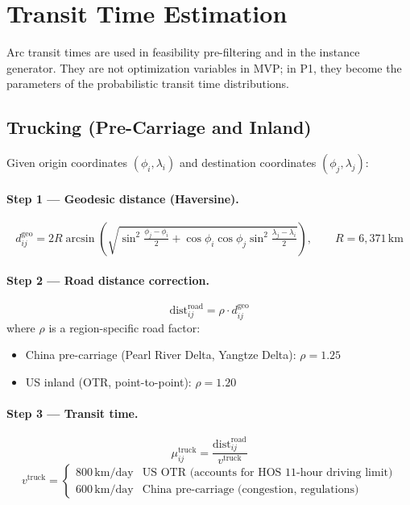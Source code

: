 \documentclass[11pt,a4paper]{article}
\theoremstyle{definition}
\begin{document}
\section{Transit Time Estimation}
\label{sec:transit}

Arc transit times are used in feasibility pre-filtering and in the instance generator.
They are not optimization variables in MVP; in P1, they become the parameters of
the probabilistic transit time distributions.

\subsection{Trucking (Pre-Carriage and Inland)}

Given origin coordinates $(\phi_i, \lambda_i)$ and destination coordinates $(\phi_j, \lambda_j)$:

\paragraph{Step 1 --- Geodesic distance (Haversine).}
\[
  d_{ij}^{\text{geo}} = 2R \arcsin\!\left(\sqrt{
    \sin^2\!\tfrac{\phi_j - \phi_i}{2}
    + \cos\phi_i \cos\phi_j \sin^2\!\tfrac{\lambda_j - \lambda_i}{2}
  }\right), \qquad R = 6{,}371\,\text{km}
\]

\paragraph{Step 2 --- Road distance correction.}
\[
  \text{dist}_{ij}^{\text{road}} = \rho \cdot d_{ij}^{\text{geo}}
\]
where $\rho$ is a region-specific road factor:
\begin{itemize}[noitemsep]
  \item China pre-carriage (Pearl River Delta, Yangtze Delta): $\rho = 1.25$
  \item US inland (OTR, point-to-point): $\rho = 1.20$
\end{itemize}

\paragraph{Step 3 --- Transit time.}
\[
  \mu_{ij}^{\text{truck}} = \frac{\text{dist}_{ij}^{\text{road}}}{v^{\text{truck}}}
\]
\[
  v^{\text{truck}} = \begin{cases}
    800\,\text{km/day} & \text{US OTR (accounts for HOS 11-hour driving limit)} \\
    600\,\text{km/day} & \text{China pre-carriage (congestion, regulations)}
  \end{cases}
\]
\end{document}

